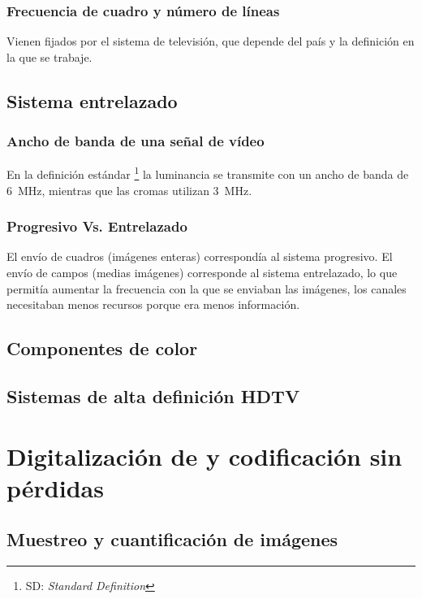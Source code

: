 \documentclass[10pt]{book}
\begin{document}
\subsection{Frecuencia de cuadro y número de líneas}

Vienen fijados por el sistema de televisión, que depende del país y la definición en la que se trabaje.

\section{Sistema entrelazado}

\subsection{Ancho de banda de una señal de vídeo}

En la definición estándar \footnote{SD: \textit{Standard Definition}} la luminancia se transmite con un ancho de banda de \SI{6}{\mega\hertz}, mientras que las cromas utilizan \SI{3}{\mega\hertz}.

\subsection{Progresivo Vs. Entrelazado}

El envío de cuadros (imágenes enteras) correspondía al sistema progresivo. El envío de campos (medias imágenes) corresponde al sistema entrelazado, lo que permitía aumentar la frecuencia con la que se enviaban las imágenes, los canales necesitaban menos recursos porque era menos información.


\section{Componentes de color}

\section{Sistemas de alta definición HDTV}


\chapter{Digitalización de y codificación sin pérdidas}

\section{Muestreo y cuantificación de imágenes}
\end{document}
